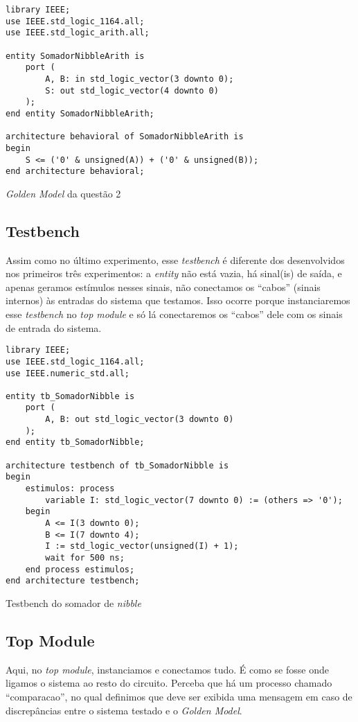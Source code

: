 \documentclass[a4paper,12pt]{article}
\newenvironment{code}{\captionsetup{type=listing}}{}
\begin{document}
\begin{code}
    \begin{verbatim}
library IEEE;
use IEEE.std_logic_1164.all;
use IEEE.std_logic_arith.all;

entity SomadorNibbleArith is
    port (
        A, B: in std_logic_vector(3 downto 0);
        S: out std_logic_vector(4 downto 0)
    );
end entity SomadorNibbleArith;

architecture behavioral of SomadorNibbleArith is
begin
    S <= ('0' & unsigned(A)) + ('0' & unsigned(B));
end architecture behavioral;
    \end{verbatim}
    \caption{\textit{Golden Model} da questão 2}
\end{code}

\subsection{Testbench}
Assim como no último experimento, esse \textit{testbench} é diferente dos desenvolvidos nos primeiros três experimentos: a \textit{entity} não está vazia, há sinal(is) de saída, e apenas geramos estímulos nesses sinais, não conectamos os ``cabos'' (sinais internos) às entradas do sistema que testamos. Isso ocorre porque instanciaremos esse \textit{testbench} no \textit{top module} e só lá conectaremos os ``cabos'' dele com os sinais de entrada do sistema.
\begin{code}
    \begin{verbatim}
library IEEE;
use IEEE.std_logic_1164.all;
use IEEE.numeric_std.all;

entity tb_SomadorNibble is
    port (
        A, B: out std_logic_vector(3 downto 0)
    );
end entity tb_SomadorNibble;

architecture testbench of tb_SomadorNibble is
begin
    estimulos: process
        variable I: std_logic_vector(7 downto 0) := (others => '0'); 
    begin
        A <= I(3 downto 0);
        B <= I(7 downto 4);
        I := std_logic_vector(unsigned(I) + 1);
        wait for 500 ns;
    end process estimulos;
end architecture testbench;
    \end{verbatim}
    \caption{Testbench do somador de \textit{nibble}}
\end{code}

\subsection{Top Module}
 Aqui, no \textit{top module}, instanciamos e conectamos tudo. É como se fosse onde ligamos o sistema ao resto do circuito. Perceba que há um processo chamado ``comparacao'', no qual definimos que deve ser exibida uma mensagem em caso de discrepâncias entre o sistema testado e o \textit{Golden Model}. 
\end{document}
